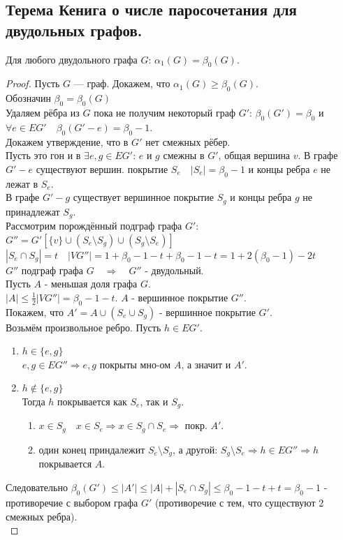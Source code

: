 \documentclass[12pt]{article}
\begin{document}
	\subsection{Терема Кенига о числе паросочетания для двудольных графов.}
			Для любого двудольного графа $G$: $\alpha_1(G) = \beta_0(G)$.
	\begin{proof}
		Пусть $G$ — граф. Докажем, что $\alpha_1(G) \ge \beta_0(G)$.\\
		Обозначин $\beta_0 = \beta_0(G)$\\
		Удаляем рёбра из $G$ пока не получим некоторый граф $G'$: $\beta_0(G') = \beta_0$ и $\forall e \in EG' \quad \beta_0(G'-e)=\beta_0-1$.\\
		
		Докажем утверждение, что в $G'$ нет смежных рёбер.\\
		Пусть это гон и в $\exists e,g \in EG'$: $e$ и $g$ смежны в $G'$, общая вершина $v$. В графе $G'-e$ существуют вершин. покрытие $S_e \quad |S_e|=\beta_0-1$ и
		концы ребра $e$ не лежат в $S_e$.\\
		В графе $G'-g$ существует вершинное покрытие $S_g$ и концы ребра $g$ не принадлежат $S_g$.\\
		Рассмотрим порождённый подграф графа $G'$: $G''=G'[\{v\} \cup (S_e \setminus S_g) \cup (S_g \setminus S_e)]$\\
		$|S_e \cap S_g| = t \quad |VG''|=1+\beta_0-1-t+\beta_0-1-t=1+2(\beta_0-1)-2t$\\
		$G''$ подграф графа $G \quad \Rightarrow  \quad G''$ - двудольный.\\
		Пусть $A$ - меньшая доля графа $G$.\\
		$|A| \le \frac{1}{2}|VG''| = \beta_0-1-t$. $A$ - вершинное покрытие $G''$.\\
		Покажем, что $A'=A \cup (S_e \cup S_g)$ - вершинное покрытие $G'$.\\
			Возьмём произвольное ребро. Пусть $h \in EG'$.\\
			\begin{enumerate}
				\item $h\in\{e, g\}$\\
					$e,g \in EG'' \Rightarrow e,g$ покрыты мно-ом $A$, а значит и $A'$.	
				\item $h\not\in\{e, g\}$\\
					Тогда $h$ покрывается как $S_e$, так и $S_g$.
					\begin{enumerate}
						\item $x \in S_g \quad x \in S_e \Rightarrow x \in S_g \cap S_e \Rightarrow$ покр. $A'$.
						\item один конец приндалежит $S_e \setminus S_g$, а другой: $S_g \setminus S_e \Rightarrow h \in EG'' \Rightarrow h$ покрывается $A$.
					\end{enumerate}
			\end{enumerate}
			Следовательно $\beta_0(G') \le |A'| \le |A| + |S_e \cap S_g| \le \beta_0-1-t + t = \beta_0-1$ - противоречие с выбором графа $G'$ (противоречие с тем, что
			существуют 2 смежных ребра).\\
			

\end{proof}
\end{document}
